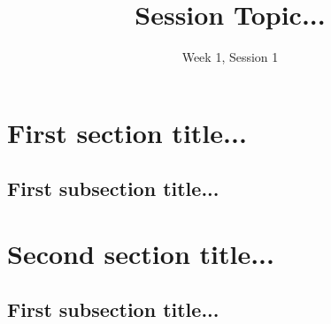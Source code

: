 \documentclass[11pt]{exam}
\title{Session Topic...}
\date{Week 1, Session 1}
\begin{document}
\maketitle

\section{First section title...}
    
    \vspace{20px}
    \subsection{First subsection title...}

\pagebreak
\section{Second section title...}
    
    \vspace{20px}
    \subsection{First subsection title...}
\end{document}

